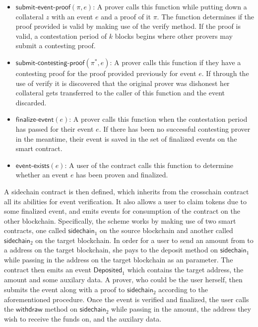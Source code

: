 \begin{itemize}
  \item $\textsf{submit-event-proof}(\pi, e)$: A prover calls this function while putting down a collateral $z$ with an event $e$ and a proof of it $\pi$. The function determines if the proof provided is valid by making use of the \textsf{verify} method. If the proof is valid, a contestation period of $k$ blocks begins where other provers may submit a contesting proof.
  \item $\textsf{submit-contesting-proof}(\pi^*, e)$: A prover calls this function if they have a contesting proof for the proof provided previously for event $e$. If through the use of \textsf{verify} it is discovered that the original prover was dishonest her collateral gets transferred to the caller of this function and the event discarded.
  \item $\textsf{finalize-event}(e)$: A prover calls this function when the contestation period has passed for their event $e$. If there has been no successful contesting prover in the meantime, their event is saved in the set of finalized events on the smart contract.
  \item $\textsf{event-exists}(e)$: A user of the contract calls this function to determine whether an event $e$ has been proven and finalized.
\end{itemize}

A \textsf{sidechain} contract is then defined, which inherits from the \textsf{crosschain} contract all its abilities for event verification. It also allows a user to claim tokens due to some finalized event, and emits events for consumption of the contract on the other blockchain. Specifically, the scheme works by making use of two smart contracts, one called $\mathsf{sidechain}_1$ on the source blockchain and another called $\mathsf{sidechain}_2$ on the target blockchain. In order for a user to send an amount from to a address on the target blockchain, she pays to the \textsf{deposit} method on $\mathsf{sidechain}_1$ while passing in the address on the target blockchain as an parameter. The contract then emits an event $\textsf{Deposited}_1$ which contains the target address, the amount and some auxilary data. A prover, who could be the user herself, then submits the event along with a proof to $\mathsf{sidechain}_2$ according to the aforementioned procedure. Once the event is verified and finalized, the user calls the $\textsf{withdraw}$ method on $\mathsf{sidechain}_2$ while passing in the amount, the address they wish to receive the funds on, and the auxilary data.

